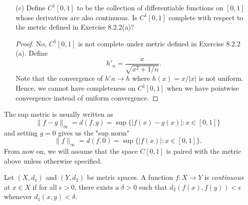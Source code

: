\begin{enumerate}
    \item[(c)] Define \( C^1[0,1] \) to be the collection of differentiable functions on \( [0,1]  \) whose derivatives are also continuous. Is \( C^{1}[0,1] \) complete with respect to the metric defined in Exercise 8.2.2(a)?
        \begin{proof}
            No, \( C^{1}[0,1] \) is not complete under metric defined in Exercise 8.2.2 (a). Define 
            \[h'_{n} = \frac{ x  }{ \sqrt{ x^{2} + 1/n  }  }. \]
            Note that the convergence of \( h'n \to h  \) where \( h(x) = x / | x |  \) is not uniform. Hence, we cannot have completeness on \( C^{1}[0,1]  \) when we have pointwise convergence instead of uniform convergence.
        \end{proof}
\end{enumerate}

The sup metric is usually written as 
\[  \lVert f -g  \rVert_{\infty }  = d(f,g) = \sup \{ | f(x) - g(x)  | : x \in [0,1] \}  \] and setting \( g = 0  \) gives us the "sup norm" 
\[  \lVert f \rVert_{\infty } = d(f,0 ) = \sup \{ | f(x)  | : x \in [0,1] \} . \]
From now on, we will assume that the space \( C[0,1]  \) is paired with the metric above unless otherwise specified.

\begin{tcolorbox}
\begin{defn}
Let \( (X, d_{1}) \) and \( (Y, d_{2}) \) be metric spaces. A function \( f: X \to Y  \) is \textit{continuous} at \( x \in  X  \) if for all \(\epsilon > 0  \), there exists a \( \delta > 0  \) such that \( d_{2}(f(x) , f(y)) < \epsilon  \) whenever \( d_{1} (x,y) < \delta \).  
\end{defn}
\end{tcolorbox}

